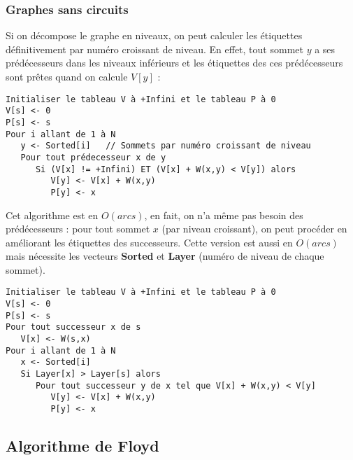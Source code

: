 \documentclass{article}
\begin{document}
\subsubsection{Graphes sans circuits}

Si on décompose le graphe en niveaux, on peut calculer les étiquettes définitivement par numéro croissant de niveau. En effet, tout sommet $y$ a ses prédécesseurs dans les 
niveaux inférieurs et les étiquettes des ces prédécesseurs sont prêtes quand on calcule $V[y]$ : 
\begin{verbatim}
Initialiser le tableau V à +Infini et le tableau P à 0
V[s] <- 0 
P[s] <- s
Pour i allant de 1 à N
   y <- Sorted[i]   // Sommets par numéro croissant de niveau
   Pour tout prédecesseur x de y
      Si (V[x] != +Infini) ET (V[x] + W(x,y) < V[y]) alors
         V[y] <- V[x] + W(x,y)
         P[y] <- x
\end{verbatim}

\noindent Cet algorithme est en $O(arcs)$, en fait, on n’a même pas besoin des prédécesseurs : pour tout sommet $x$ (par niveau croissant), on peut procéder en améliorant les 
étiquettes des successeurs. Cette version est aussi en $O(arcs)$ mais nécessite les vecteurs \textbf{Sorted} et \textbf{Layer} (numéro de niveau de chaque sommet).
\begin{verbatim}
Initialiser le tableau V à +Infini et le tableau P à 0
V[s] <- 0 
P[s] <- s
Pour tout successeur x de s
   V[x] <- W(s,x)
Pour i allant de 1 à N
   x <- Sorted[i]
   Si Layer[x] > Layer[s] alors
      Pour tout successeur y de x tel que V[x] + W(x,y) < V[y]
         V[y] <- V[x] + W(x,y)
         P[y] <- x
\end{verbatim}


\subsection{Algorithme de Floyd}
\end{document}
